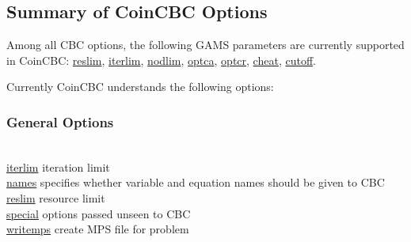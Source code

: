 \subsection{Summary of CoinCBC Options}

Among all CBC options, the following GAMS parameters are currently supported in CoinCBC:
\hyperlink{reslim}{reslim}, \hyperlink{iterlim}{iterlim}, \hyperlink{nodlim}{nodlim}, \hyperlink{optca}{optca}, \hyperlink{optcr}{optcr}, \hyperlink{increment}{cheat}, \hyperlink{cutoff}{cutoff}.

Currently CoinCBC understands the following options:

\subsubsection{General Options}
\begin{tabbing}
\hspace {1.3in} \= \\
\hyperlink{iterlim}
{iterlim} \> iteration limit \\
\hyperlink{names}
{names} \> specifies whether variable and equation names should be given to CBC \\
\hyperlink{reslim}
{reslim} \> resource limit \\
\hyperlink{special}
{special} \> options passed unseen to CBC \\
\hyperlink{writemps}
{writemps} \> create MPS file for problem
\end{tabbing}

